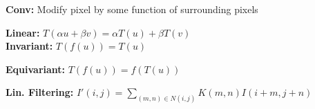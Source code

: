\textbf{Conv:} Modify pixel by some function of surrounding  pixels

\textbf{Linear:} $T(\alpha u + \beta v) = \alpha T(u) + \beta T(v)$\\
\textbf{Invariant:} $T(f(u)) = T(u)$\\

\textbf{Equivariant:} $T(f(u)) = f(T(u))$\\

\textbf{Lin. Filtering:} $I'(i,j) = \sum_{(m,n) \in N(i,j)} K(m,n) I(i+m, j+n)$\\

